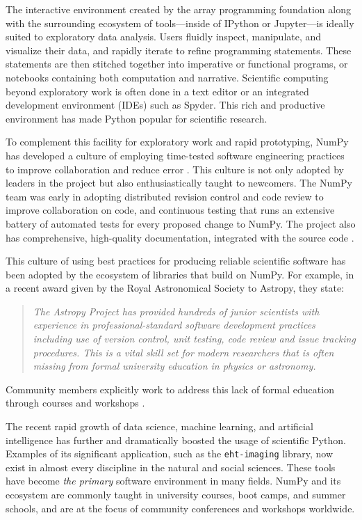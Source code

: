 \documentclass[twocolumn]{article}
\begin{document}
The interactive environment created by the array programming
foundation along with the surrounding ecosystem of tools---inside of
IPython or Jupyter---is ideally suited to exploratory data analysis.
Users fluidly inspect, manipulate, and visualize their data, and
rapidly iterate to refine programming statements. These statements are
then stitched together into imperative or functional programs, or
notebooks containing both computation and narrative.
Scientific computing beyond exploratory work is often done in a text editor
or an integrated development environment (IDEs) such as Spyder.
This rich and productive environment has made Python popular
for scientific research.

To complement this facility for exploratory work and rapid
prototyping, NumPy has developed a culture of
employing time-tested software engineering practices to improve collaboration and
reduce error \cite{millman2014developing}.  This culture is not only
adopted by leaders in the project but also enthusiastically taught to
newcomers. The NumPy team was early in adopting distributed revision
control and code review to improve collaboration on code, and
continuous testing that runs an extensive battery of automated tests for
every proposed change to NumPy.  The project also has comprehensive,
high-quality documentation, integrated with the source
code \cite{vanderwalt2008scipy,harrington2008scipy,harrington2009scipy}.



This culture of using best practices for producing reliable scientific software
has been adopted by the ecosystem of libraries that build on NumPy.
For example, in a recent award given by the Royal Astronomical Society to
Astropy, they state:
\begin{quotation}
\noindent\emph{The Astropy Project has provided hundreds of junior scientists
with experience in professional-standard software development practices
including use of version control, unit testing, code review and issue tracking
procedures. This is a vital skill set for modern researchers that is often
missing from formal university education in physics or astronomy.}
\end{quotation}
Community members explicitly work to address this lack of formal education
through courses and workshops
\cite{wilson-software-carpentry,hannay-scientific-software-survey,millman2018teaching}.


The recent rapid growth of data science, machine learning, and
artificial intelligence has further and dramatically boosted the usage of
scientific Python.  Examples of its significant application, such as the
\texttt{eht-imaging} library, now exist in almost every discipline in the natural and social
sciences.  These tools have become \emph{the primary}
software environment in many fields.  NumPy and its ecosystem are commonly
taught in university courses, boot camps, and summer schools, and are
at the focus of community conferences and workshops worldwide.
\end{document}

